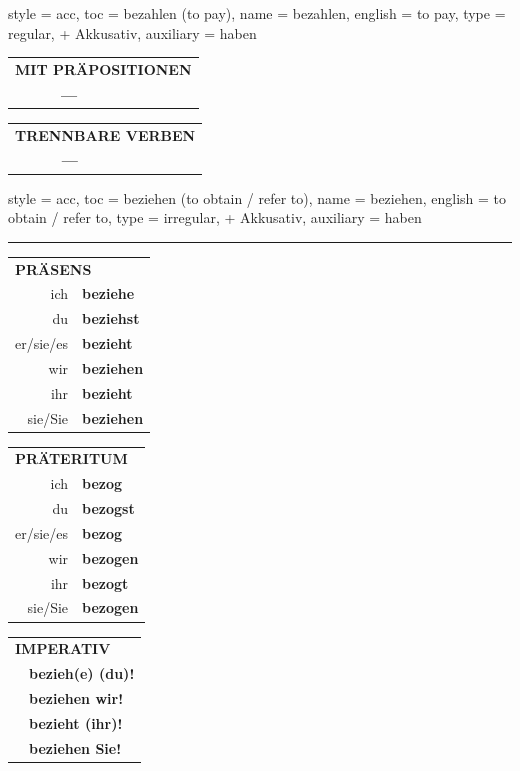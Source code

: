 \begin{verbentry}{
  style = {acc},
  toc = {bezahlen (to pay)},
  name = {bezahlen},
  english = {to pay},
  type = {regular, + Akkusativ},
  auxiliary = {haben}
}
  \vspace{10pt}

\begin{tabular}{lll}
\multicolumn{3}{l}{\textbf{MIT PRÄPOSITIONEN}}\\
& \textbf{---} & \\
\end{tabular}
\hfill
\begin{tabular}{lll}
\multicolumn{3}{l}{\textbf{TRENNBARE VERBEN}}\\
& \textbf{---} & \\
\end{tabular}

\vspace{-5pt}
\end{verbentry}

\begin{verbentry}{
  style = {acc},
  toc = {beziehen (to obtain / refer to)},
  name = {beziehen},
  english = {to obtain / refer to},
  type = {irregular, + Akkusativ},
  auxiliary = {haben}
}


\vspace{5pt}
\hrule
\vspace{5pt}

\begin{tabular}{rl}
\multicolumn{2}{l}{\textbf{PRÄSENS}}\\
ich & \textbf{beziehe}\\
du & \textbf{beziehst}\\
er/sie/es & \textbf{bezieht}\\
wir & \textbf{beziehen}\\
ihr & \textbf{bezieht}\\
sie/Sie & \textbf{beziehen}\\
\end{tabular}
\hfill
\begin{tabular}{rl}
\multicolumn{2}{l}{\textbf{PRÄTERITUM}}\\
ich & \textbf{bezog}\\
du & \textbf{bezogst}\\
er/sie/es & \textbf{bezog}\\
wir & \textbf{bezogen}\\
ihr & \textbf{bezogt}\\
sie/Sie & \textbf{bezogen}\\
\end{tabular}
\hfill
\begin{tabular}{rl}
\multicolumn{2}{l}{\textbf{IMPERATIV}}\\
& \textbf{bezieh(e) (du)!}\\
& \textbf{beziehen wir!}\\
& \textbf{bezieht (ihr)!}\\
& \textbf{beziehen Sie!}\\
\end{tabular}


\end{verbentry}
